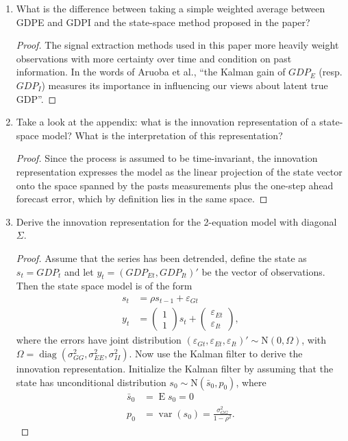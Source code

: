 \documentclass[oneside,reqno]{amsart}
\DeclareMathOperator{\E}{E}
\DeclareMathOperator{\var}{var}
\DeclareMathOperator{\diag}{diag}
\newcommand{\eps}{\varepsilon}
\newcommand{\N}{\mathrm N}
\theoremstyle{definition}
\begin{document}
\begin{enumerate}[label=(\roman*)]
\item
What is the difference between taking a simple weighted average between GDPE and GDPI and the state-space method proposed in the paper?
\begin{proof}
The signal extraction methods used in this paper more heavily weight observations with more certainty over time and condition on past information. In the words of  Aruoba et al., ``the Kalman gain of $GDP_E$ (resp. $GDP_I$) measures its importance in influencing our views about latent true GDP''.
\end{proof}
\item
Take a look at the appendix: what is the innovation representation of a
state-space model? What is the interpretation of this representation?
\begin{proof}
Since the process is assumed to be time-invariant, the innovation representation expresses the model as the linear projection of the state vector onto the space spanned by the pasts measurements plus the one-step ahead forecast error, which by definition lies in the same space.
\end{proof}
\item
Derive the innovation representation for the 2-equation model with diagonal $\Sigma$.
\begin{proof}
Assume that the series has been detrended, define the state as $s_t = GDP_t$ and let $y_t = (GDP_{Et}, GDP_{It})'$ be the vector of observations. Then the state space model is of the form
\begin{align}
	s_t & =  \rho s_{t-1} + \eps_{Gt} \\
	y_t &= \begin{pmatrix}
		1 \\ 1
	\end{pmatrix} s_t
	+ \begin{pmatrix}
		\eps_{Et} \\ \eps_{It}
	\end{pmatrix},
\end{align}
where the errors have joint distribution $(\eps_{Gt}, \eps_{Et}, \eps_{It})' \sim \N(0, \Omega)$, with $\Omega = \diag(\sigma_{GG}^2, \sigma_{EE}^2, \sigma_{II}^2)$. Now use the Kalman filter to derive the innovation representation. Initialize the Kalman filter by assuming that the state has unconditional distribution $s_0 \sim \N(\bar s_0, p_0)$, where
\begin{align*}
	\bar s_0 &= \E s_0 = 0 \\
	p_0 &= \var(s_0) = \frac{\sigma^2_{GG}}{1-\rho^2}.
\end{align*}

\end{proof}
\end{enumerate}
\end{document}
